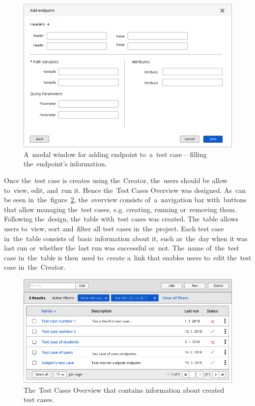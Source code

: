 \begin{figure}[!hbt]
	\centering
	\includegraphics[scale=0.4]{./designs/drafts-1.0/add-endpoint-2.png}
	\caption{A~modal window for adding endpoint to~a~test case -- filling
	the~endpoint's information.}
	\label{add-endpoint-2}
\end{figure}

Once the~test case is creates using the~Creator, the~users should be allow
to~view, edit, and~run it. Hence the~Test Cases Overview was designed. As~can be
seen in~the~figure~\ref{test-cases}, the~overview consists of~a~navigation bar
with~buttons that allow managing the~test cases, e.g. creating, running
or~removing them. Following the~design, the~table with~test cases was created.
The~table allows users to~view, sort and~filter all test cases in~the~project.
Each test case in~the~table consists of~basic information about it, such
as~the~day when it was last run or~whether the~last run was successful or~not.
The~name of~the~test case in~the~table is then~used to~create a~link that
enables users to~edit the~test case in~the~Creator.

\begin{figure}[!hbt]
	\centering
	\includegraphics[scale=0.4]{./designs/drafts-1.0/test-cases.png}
	\caption{The~Test Cases Overview that contains information about created test
	cases.}
	\label{test-cases}
\end{figure}

